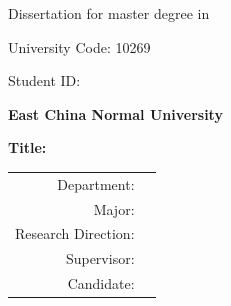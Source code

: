 \begin{titlepage}
\begin{center}
    \vfill 

    \Date
\end{center}    

\clearpage{\pagestyle{empty}\cleardoublepage}

\thispagestyle{empty}
\noindent Dissertation for master degree in \Year

\hfill University Code: 10269

\hfill Student ID: \StudentID

\vspace{5em}
\begin{center}
    {
         \textbf{East China Normal University}
    }

    \vspace{6em}

    {
        \bfseries {} Title: \parbox[t]{20em}{\TitleEn}
    }
    

    \newcommand{\bsEn}[1]{\underline{\makebox[22em][l]{#1}}}
    \vfill
    {   
        \bfseries
        \renewcommand{\arraystretch}{1.2}
        \begin{tabular}{rl}
        Department:         & \bsEn{\DepartmentEn} \\
        Major:              & \bsEn{\MajorEn} \\
        Research Direction: & \bsEn{\DirectionEn} \\
        Supervisor:         & \bsEn{\SupervisorEn} \\
        Candidate:          & \bsEn{\CandidateEn} \\
    \end{tabular}
    }
    \vfill

    \DateEn
\end{center}
\end{titlepage}

\clearpage{\pagestyle{empty}\cleardoublepage}